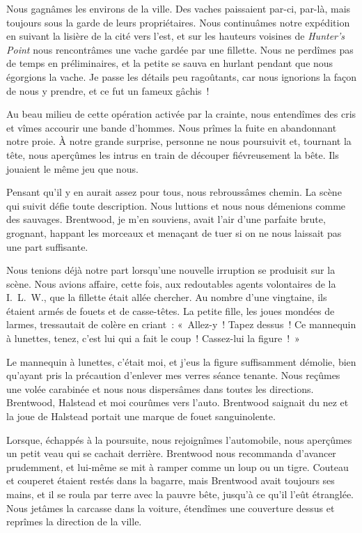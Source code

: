 \documentclass[french,twoside]{book} %
\begin{document}
Nous gagnâmes les environs de la ville. Des vaches paissaient par-ci, par-là, mais toujours sous la garde de leurs propriétaires. Nous continuâmes notre expédition en suivant la lisière de la cité vers l’est, et sur les hauteurs voisines de \emph{Hunter’s Point} nous rencontrâmes une vache gardée par une fillette. Nous ne perdîmes pas de temps en préliminaires, et la petite se sauva en hurlant pendant que nous égorgions la vache. Je passe les détails peu ragoûtants, car nous ignorions la façon de nous y prendre, et ce fut un fameux gâchis !\par
Au beau milieu de cette opération activée par la crainte, nous entendîmes des cris et vîmes accourir une bande d’hommes. Nous prîmes la fuite en abandonnant notre proie. À notre grande surprise, personne ne nous poursuivit et, tournant la tête, nous aperçûmes les intrus en train de découper fiévreusement la bête. Ils jouaient le même jeu que nous.\par
Pensant qu’il y en aurait assez pour tous, nous rebroussâmes chemin. La scène qui suivit défie toute description. Nous luttions et nous nous démenions comme des sauvages. Brentwood, je m’en souviens, avait l’air d’une parfaite brute, grognant, happant les morceaux et menaçant de tuer si on ne nous laissait pas une part suffisante.\par
Nous tenions déjà notre part lorsqu’une nouvelle irruption se produisit sur la scène. Nous avions affaire, cette fois, aux redoutables agents volontaires de la I. L. W., que la fillette était allée chercher. Au nombre d’une vingtaine, ils étaient armés de fouets et de casse-têtes. La petite fille, les joues mondées de larmes, tressautait de colère en criant : « Allez-y ! Tapez dessus ! Ce mannequin à lunettes, tenez, c’est lui qui a fait le coup ! Cassez-lui la figure ! »\par
Le mannequin à lunettes, c’était moi, et j’eus la figure suffisamment démolie, bien qu’ayant pris la précaution d’enlever mes verres séance tenante. Nous reçûmes une volée carabinée et nous nous dispersâmes dans toutes les directions. Brentwood, Halstead et moi courûmes vers l’auto. Brentwood saignait du nez et la joue de Halstead portait une marque de fouet sanguinolente.\par
Lorsque, échappés à la poursuite, nous rejoignîmes l’automobile, nous aperçûmes un petit veau qui se cachait derrière. Brentwood nous recommanda d’avancer prudemment, et lui-même se mit à ramper comme un loup ou un tigre. Couteau et couperet étaient restés dans la bagarre, mais Brentwood avait toujours ses mains, et il se roula par terre avec la pauvre bête, jusqu’à ce qu’il l’eût étranglée. Nous jetâmes la carcasse dans la voiture, étendîmes une couverture dessus et reprîmes la direction de la ville.\par
\end{document}
